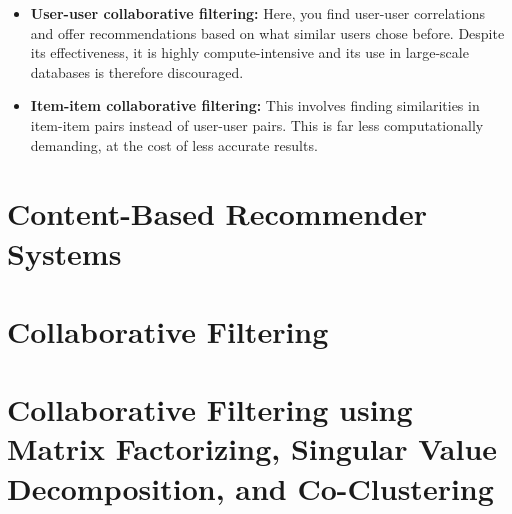 \documentclass{article}
\begin{document}
\begin{itemize}
    \item{\textbf{User-user collaborative filtering:} Here, you find user-user correlations and offer recommendations based on what similar users chose before. Despite its effectiveness, it is highly compute-intensive and its use in large-scale databases is therefore discouraged.}
    \item{\textbf{Item-item collaborative filtering:} This involves finding similarities in item-item pairs instead of user-user pairs. This is far less computationally demanding, at the cost of less accurate results.}
\end{itemize}

\section{Content-Based Recommender Systems}
\section{Collaborative Filtering}
\section{Collaborative Filtering using Matrix Factorizing, Singular Value Decomposition, and Co-Clustering}
\end{document}
